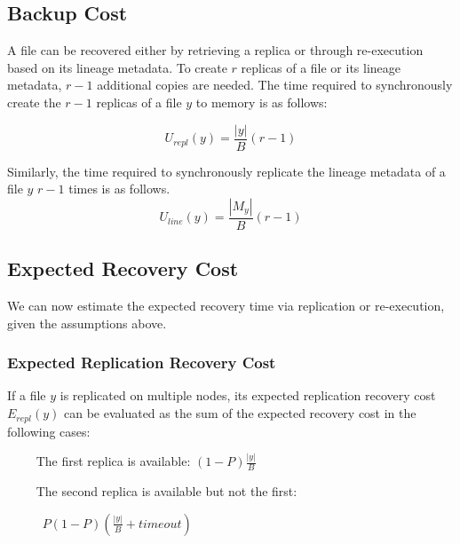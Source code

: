 \documentclass{sig-alternate}
\newcommand{\katznote}[1]{ {\textcolor{blue}    { ***Dan:      #1 }}}
\newcommand{\kylenote}[1]{{\textcolor{orange}    { ***Kyle:      #1 }}}
\newcommand{\katznote}[1]{}
\newcommand{\kylenote}[1]{}
\begin{document}
\subsection{Backup Cost}
A file can be recovered either by retrieving a replica or through re-execution based on its lineage metadata.  To create $r$ replicas of a file or its lineage metadata, $r-1$ additional copies are needed.  The time required to synchronously create the $r-1$ replicas of a file $y$ to memory is as follows:

\begin{equation}
U_{repl}(y) = \frac{|y|}{B} (r-1)
\end{equation}

Similarly, the time required to synchronously replicate the lineage metadata of a file $y$ $r-1$ times is as follows.
\begin{equation}
U_{line}(y) = \frac{|M_{y}|}{B} (r-1)
\end{equation}

\subsection{Expected Recovery Cost}

We can now estimate the expected recovery time via replication or re-execution, given the assumptions above.

\subsubsection{Expected Replication Recovery Cost}
If a file $y$ is replicated on multiple nodes,
its expected replication recovery cost $E_{repl}(y)$ can be evaluated as the sum
of the expected recovery cost in the following cases:

\noindent ~~~~ The first replica is available: $(1-P)\frac{|y|}{B}$

\noindent ~~~~ The second replica is available but not the first:\\

\vspace{-2ex}

~~~~~ $P(1-P)\left(\frac{|y|}{B}+timeout\right)$
\end{document}
